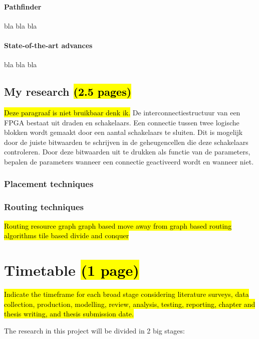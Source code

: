 \documentclass[a4paper,oneside,12pt]{article}
\begin{document}
\paragraph{Pathfinder}
bla bla bla

\paragraph{State-of-the-art advances}
bla bla bla

\subsection{My research \hl{(2.5 pages)}}

\hl{Deze paragraaf is niet bruikbaar denk ik.}
De interconnectiestructuur van een FPGA bestaat uit draden en schakelaars. Een connectie tussen twee logische blokken wordt gemaakt door een aantal schakelaars te sluiten. Dit is mogelijk door de juiste bitwaarden te schrijven in de geheugencellen die deze schakelaars controleren. Door deze bitwaarden uit te drukken als functie van de parameters, bepalen de parameters wanneer een connectie geactiveerd wordt en wanneer niet.


\subsubsection{Placement techniques}\label{placetech}


\subsubsection{Routing techniques}\label{routetech}

\hl{Routing resource graph
graph based
move away from graph based routing algorithms
tile based
divide and conquer}

\newpage

\section{Timetable \hl{(1 page)}}\label{timetable}
\hl{ Indicate the timeframe for each broad stage considering literature surveys, data collection, production, modelling, review, analysis,
testing, reporting, chapter and thesis writing, and thesis submission date.}

The research in this project will be divided in 2 big stages:
\end{document}
